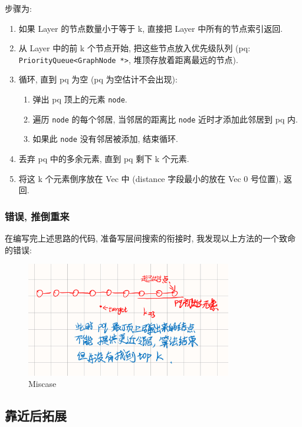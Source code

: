 步骤为:

\begin{enumerate}
    \item 如果 Layer 的节点数量小于等于 k, 直接把 Layer 中所有的节点索引返回.
    \item 从 Layer 中的前 k 个节点开始, 把这些节点放入优先级队列 (pq: \texttt{PriorityQueue<GraphNode *>},
    堆顶存放着距离最远的节点).
    \item 循环, 直到 pq 为空 (pq 为空估计不会出现):
    \begin{enumerate}
        \item 弹出 pq 顶上的元素 \texttt{node}.
        \item 遍历 \texttt{node} 的每个邻居, 当邻居的距离比 \texttt{node} 近时才添加此邻居到 pq 内.
        \item 如果此 \texttt{node} 没有邻居被添加, 结束循环.
    \end{enumerate}
    \item 丢弃 pq 中的多余元素, 直到 pq 剩下 k 个元素.
    \item 将这 k 个元素倒序放在 Vec 中 (distance 字段最小的放在 Vec 0 号位置), 返回.
\end{enumerate}

\subsubsection{错误, 推倒重来}

在编写完上述思路的代码, 准备写层间搜索的衔接时, 我发现以上方法的一个致命的错误:

\begin{figure}[H]
    \centering
    \includegraphics[width=0.8\textwidth]{img/miscase}
    \caption{Miscase}
\end{figure}

\subsection{靠近后拓展}


